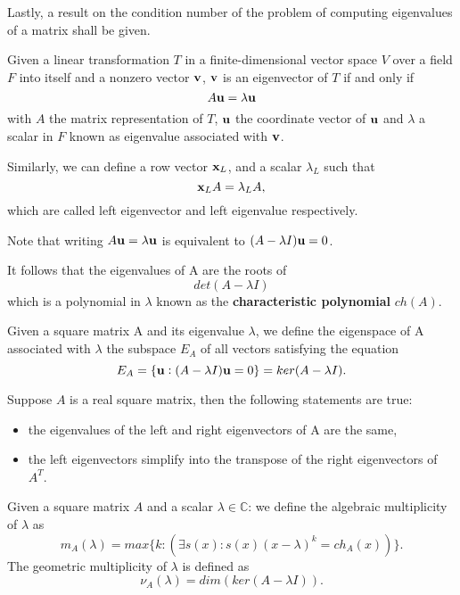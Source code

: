 Lastly, a result on the condition number of the problem
of computing eigenvalues of a matrix shall be given.
\begin{definition}
    Given a linear transformation \(T\) in a finite-dimensional vector space \(V\) over a field \(F\) into itself and a nonzero
    vector
    \(\vb{v}\), \(\vb{v}\) is an eigenvector of \(T\) if and only if
    \[ A \vb{u} = \lambda \vb{u} \]
    with \(A\) the matrix representation of \(T\), \(\vb{u}\) the coordinate vector of \(\vb{u}\) and \(\lambda\) a scalar in
    \(F\) known as eigenvalue associated with \(\vb{v}\).

    Similarly, we can define a row vector \(\vb{x}_{L}\), and a scalar \(\lambda_{L}\) such that
    \[\vb{x}_{L}A = \lambda_{L}A,\]
    which are called left eigenvector and left eigenvalue respectively.
\end{definition}

\begin{remark}
    Note that writing
    \( A \vb{u} = \lambda \vb{u} \) is equivalent to \( (A - \lambda I)\vb{u} = 0 \).

    It follows that the eigenvalues of A are the roots of
    \[ det(A - \lambda I) \]
    which is a polynomial in \(\lambda\) known as the \textbf{characteristic polynomial} \(ch(A)\).
\end{remark}

\begin{definition}[Eigenspace]
    Given a square matrix A and its eigenvalue \(\lambda\), we define the eigenspace of A associated with \(\lambda\) the subspace
    \(E_{A}\) of all vectors satisfying the equation
    \[E_{A} = \{\vb{u}: (A - \lambda I)\vb{u} = 0\} = ker(A - \lambda I).\]
\end{definition}

\begin{remark}
    Suppose \(A\) is a real square matrix, then the following statements are true:
    \begin{itemize}[topsep=0pt, itemsep=0pt, parsep=0pt]
        \item the eigenvalues of the left and right eigenvectors of A are the same,
        \item the left eigenvectors simplify into the transpose of the right eigenvectors of \(A^T\).
    \end{itemize}
\end{remark}

\begin{definition}
    Given a square matrix \(A\) and a scalar \(\lambda \in \mathbb{C}\): we define the algebraic multiplicity of \(\lambda\) as
    \[ m_{A}(\lambda) = max\{k: (\exists s(x): s(x)(x - \lambda)^k = ch_{A}(x))\}.\]
    The geometric multiplicity of \(\lambda\) is defined as
    \[
        \nu_{A}(\lambda) = dim(ker(A - \lambda I)).
    \]
\end{definition}

